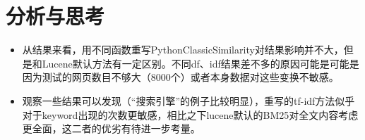 \documentclass[12pt,a4paper]{article}
\begin{document}
\section{分析与思考}
\begin{itemize}
	\item 从结果来看，用不同函数重写PythonClassicSimilarity对结果影响并不大，但是和Lucene默认方法有一定区别。不同df、idf结果差不多的原因可能是可能是因为测试的网页数目不够大（8000个）或者本身数据对这些变换不敏感。
	\item 观察一些结果可以发现（“搜索引擎”的例子比较明显），重写的tf-idf方法似乎对于keyword出现的次数更敏感，相比之下lucene默认的BM25对全文内容考虑更全面，这二者的优劣有待进一步考量。
\end{itemize}
\end{document}
